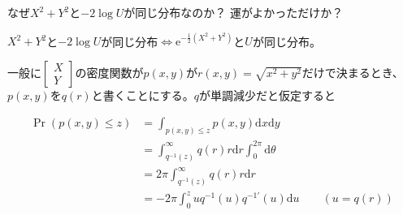 \documentclass[lualatex,handout]{beamer}
\theoremstyle{definition}
\begin{document}
\begin{frame}{なぜ$X^2+Y^2$と$-2\log U$が同じ分布なのか？}
運がよかっただけか？

\vspace{1em}
$X^2+Y^2$と$-2\log U$が同じ分布$\iff \mathrm{e}^{-\frac12(X^2+Y^2)}$と$U$が同じ分布。

一般に$\begin{bmatrix}X\\Y\end{bmatrix}$の密度関数が$p(x,y)$が$r(x,y)=\sqrt{x^2+y^2}$だけで決まるとき、
$p(x,y)$を$q(r)$と書くことにする。$q$が単調減少だと仮定すると

\begin{align*}
\Pr(p(x, y) \le z) &= \int_{p(x,y)\le z} p(x,y)\mathrm{d}x\mathrm{d}y\\
 &= \int_{q^{-1}(z)}^\infty q(r)r \mathrm{d}r\int_{0}^{2\pi}\mathrm{d}\theta\\
 &= 2\pi\int_{q^{-1}(z)}^\infty q(r)r \mathrm{d}r\\
 &= -2\pi\int_{0}^z u q^{-1}(u) q^{-1'}(u) \mathrm{d}u \qquad(u = q(r))
\end{align*}

\end{frame}
\end{document}
